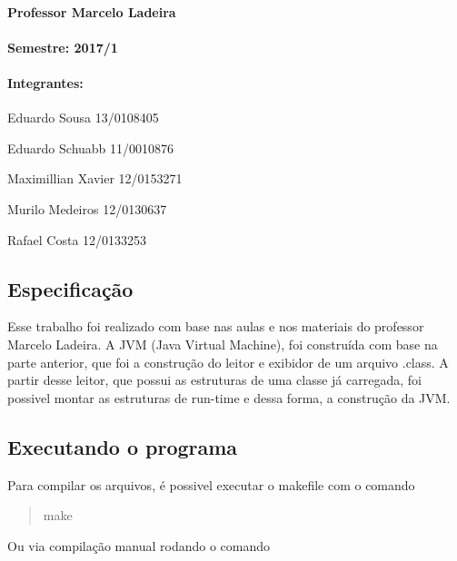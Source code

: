 \paragraph*{Professor Marcelo Ladeira}

\paragraph*{Semestre\+: 2017/1}

\paragraph*{Integrantes\+:}


\begin{DoxyItemize}
\item Eduardo Sousa 13/0108405
\item Eduardo Schuabb 11/0010876
\item Maximillian Xavier 12/0153271
\item Murilo Medeiros 12/0130637
\item Rafael Costa 12/0133253
\end{DoxyItemize}

\subsection*{Especificação}

Esse trabalho foi realizado com base nas aulas e nos materiais do professor Marcelo Ladeira. A J\+VM (Java Virtual Machine), foi construída com base na parte anterior, que foi a construção do leitor e exibidor de um arquivo .class. A partir desse leitor, que possui as estruturas de uma classe já carregada, foi possivel montar as estruturas de run-\/time e dessa forma, a construção da J\+VM.

\subsection*{Executando o programa}

Para compilar os arquivos, é possivel executar o makefile com o comando

\begin{quote}
make \end{quote}


Ou via compilação manual rodando o comando

